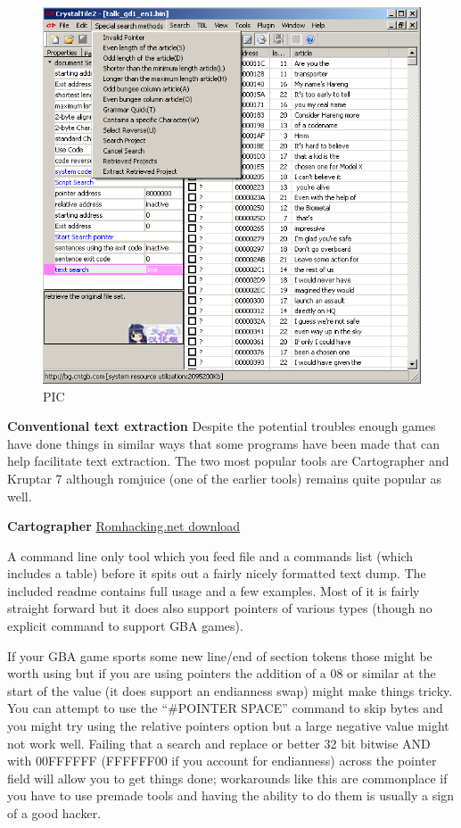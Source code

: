 \documentclass[
]{book}
\begin{document}
\begin{figure}
\centering
\includegraphics{images/132_home_fast6191_romhackingguide_unrenamed_fil___l_borders_romhackingguiderCT2textextraction.png}
\caption{PIC}
\end{figure}

\textbf{Conventional text extraction} Despite the potential troubles enough games have done things in similar ways that some programs have been made that can help facilitate text extraction. The two most popular tools are Cartographer and Kruptar 7 although romjuice (one of the earlier tools) remains quite popular as well.

\textbf{Cartographer} \href{http://www.romhacking.net/utilities/647/}{Romhacking.net download}

A command line only tool which you feed file and a commands list (which includes a table) before it spits out a fairly nicely formatted text dump. The included readme contains full usage and a few examples. Most of it is fairly straight forward but it does also support pointers of various types (though no explicit command to support GBA games).

If your GBA game sports some new line/end of section tokens those might be worth using but if you are using pointers the addition of a 08 or similar at the start of the value (it does support an endianness swap) might make things tricky. You can attempt to use the ``\#POINTER SPACE'' command to skip bytes and you might try using the relative pointers option but a large negative value might not work well. Failing that a search and replace or better 32 bit bitwise AND with 00FFFFFF (FFFFFF00 if you account for endianness) across the pointer field will allow you to get things done; workarounds like this are commonplace if you have to use premade tools and having the ability to do them is usually a sign of a good hacker.
\end{document}
